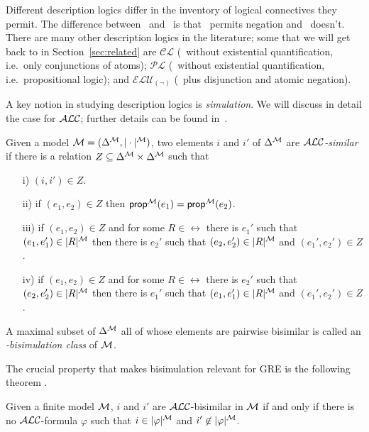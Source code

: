 Different description logics differ in the inventory of logical
connectives they permit.  The difference between \alc\ and \el\ is
that \alc\ permits negation and \el\ doesn't.  There are many other
description logics in the literature; some that we will get back to in
Section~\ref{sec:related} are $\mathcal{CL}$ (\el\ without existential
quantification, i.e.\ only conjunctions of atoms); $\mathcal{PL}$
(\alc\ without existential quantification, i.e.\ propositional logic);
and $\mathcal{ELU}_{(\neg)}$ (\el\ plus disjunction and atomic
negation).

A key notion in studying description logics is \emph{simulation}.
We will discuss in detail the case for $\mathcal{ALC}$; further details can be
found in~\cite{blac:moda01,kurt:expr99}.

\begin{definition}
Given a model $\mathcal{M} = (\Delta^{\mathcal{M}},|\cdot|^{\mathcal{M}})$, two elements $i$ and
$i'$ of $\Delta^{\mathcal{M}}$ are \emph{$\mathcal{ALC}$-similar} if there is a relation $Z
\subseteq \Delta^{\mathcal{M}} \times \Delta^{\mathcal{M}}$ such that 
\begin{itemize}
\item[i)] $(i,i') \in Z$.\\[-1.5em]
\item[ii)] if $(e_1, e_2) \in Z$ then $\textsf{prop}^{\mathcal{M}}(e_1) = \textsf{prop}^{\mathcal{M}}(e_2)$.\\[-1.5em]
\item[iii)] if $(e_1,e_2) \in Z$ and for some $R \in \rel$ there is $e_1'$ such that
$(e_1,e_1') \in |R|^{\mathcal{M}}$ then there is $e_2'$ such that $(e_2,e_2') \in |R|^{\mathcal{M}}$ and
$(e_1',e_2') \in Z$.\\[-1.5em]
\item[iv)] if $(e_1,e_2) \in Z$ and for some $R \in \rel$ there is $e_2'$ such that
$(e_2,e_2') \in |R|^{\mathcal{M}}$ then there is $e_1'$ such that $(e_1,e_1') \in |R|^{\mathcal{M}}$ and
$(e_1',e_2') \in Z$.
\end{itemize}
A maximal subset of $\Delta^{\mathcal{M}}$ all of whose elements are pairwise
bisimilar is called an \emph{\alc-bisimulation class} of $\mathcal{M}$.
\end{definition}

The crucial property that makes bisimulation relevant for GRE is the
following theorem \cite{blac:moda01}.

\begin{theorem}\label{bisim}
  Given a finite model $\mathcal{M}$, $i$ and $i'$ are $\mathcal{ALC}$-bisimilar in
  $\mathcal{M}$ if and only if there is no $\mathcal{ALC}$-formula $\varphi$ such that
  $i \in |\varphi|^{\mathcal{M}}$ and $i' \not \in |\varphi|^{\mathcal{M}}$.
\end{theorem}

